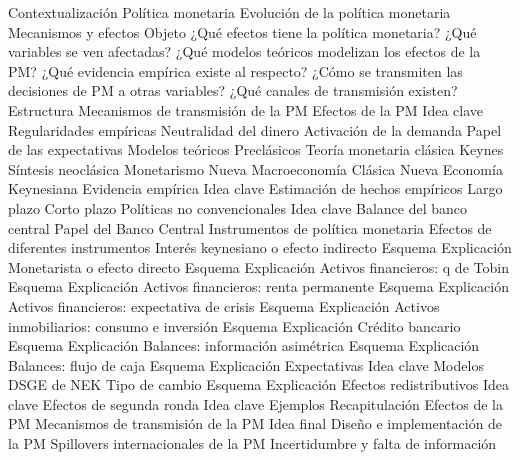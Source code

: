 \documentclass{nuevotema}
\begin{document}
\begin{esquema}[enumerate]
	\1[] 
		\2 Contextualización
			\3 Política monetaria
			\3 Evolución de la política monetaria
			\3 Mecanismos y efectos
		\2 Objeto
			\3 ¿Qué efectos tiene la política monetaria?
			\3 ¿Qué variables se ven afectadas?
			\3 ¿Qué modelos teóricos modelizan los efectos de la PM?
			\3 ¿Qué evidencia empírica existe al respecto?
			\3 ¿Cómo se transmiten las decisiones de PM a otras variables?
			\3 ¿Qué canales de transmisión existen?
		\2 Estructura
			\3 Mecanismos de transmisión de la PM
			\3 Efectos de la PM
	\1 
		\2 Idea clave
			\3 Regularidades empíricas
			\3 Neutralidad del dinero
			\3 Activación de la demanda
			\3 Papel de las expectativas
		\2 Modelos teóricos
			\3 Preclásicos
			\3 Teoría monetaria clásica
			\3 Keynes
			\3 Síntesis neoclásica
			\3 Monetarismo
			\3 Nueva Macroeconomía Clásica
			\3 Nueva Economía Keynesiana
		\2 Evidencia empírica
			\3 Idea clave
			\3 Estimación de hechos empíricos
			\3 Largo plazo
			\3 Corto plazo
			\3 Políticas no convencionales
	\1 
		\2 Idea clave
			\3 Balance del banco central
			\3 Papel del Banco Central
			\3 Instrumentos de política monetaria
			\3 Efectos de diferentes instrumentos
		\2 Interés keynesiano o efecto indirecto
			\3 Esquema
			\3 Explicación
		\2 Monetarista o efecto directo
			\3 Esquema
			\3 Explicación
		\2 Activos financieros: q de Tobin
			\3 Esquema
			\3 Explicación
		\2 Activos financieros: renta permanente
			\3 Esquema
			\3 Explicación
		\2 Activos financieros: expectativa de crisis
			\3 Esquema
			\3 Explicación
		\2 Activos inmobiliarios: consumo e inversión
			\3 Esquema
			\3 Explicación
		\2 Crédito bancario
			\3 Esquema
			\3 Explicación
		\2 Balances: información asimétrica
			\3 Esquema
			\3 Explicación
		\2 Balances: flujo de caja
			\3 Esquema
			\3 Explicación
		\2 Expectativas
			\3 Idea clave
			\3 Modelos DSGE de NEK
		\2 Tipo de cambio
			\3 Esquema
			\3 Explicación
		\2 Efectos redistributivos
			\3 Idea clave
		\2 Efectos de segunda ronda
			\3 Idea clave
			\3 Ejemplos
	\1[] 
		\2 Recapitulación
			\3 Efectos de la PM
			\3 Mecanismos de transmisión de la PM
		\2 Idea final
			\3 Diseño e implementación de la PM
			\3 Spillovers internacionales de la PM
			\3 Incertidumbre y falta de información

\end{esquema}

\esquemalargo
\end{document}

